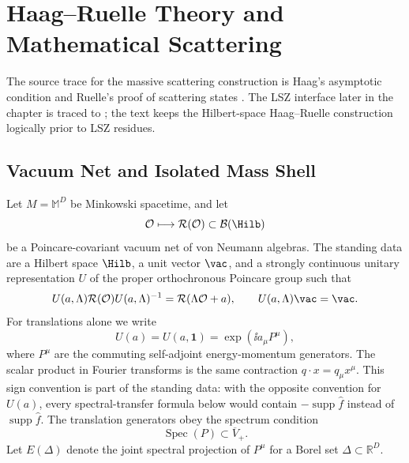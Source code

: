 \chapter{Haag--Ruelle Theory and Mathematical Scattering}
\label{ch:volume-iv-haag-ruelle-mathematical-scattering}
\ConventionsLorentzian

The source trace for the massive scattering construction is Haag's asymptotic
condition and Ruelle's proof of scattering states \cite{Haag1958,Ruelle1962}.
The LSZ interface later in the chapter is traced to \cite{LSZ1955}; the text
keeps the Hilbert-space Haag--Ruelle construction logically prior to LSZ
residues.

\section{Vacuum Net and Isolated Mass Shell}

Let \(M=\mathbb M^D\) be Minkowski spacetime, and let
\[
  \mathcal O\longmapsto \mathcal R(\mathcal O)\subset\mathcal B(\Hilb)
\]
be a Poincare-covariant vacuum net of von Neumann algebras.  The standing
data are a Hilbert space \(\Hilb\), a unit vector \(\vac\), and a strongly
continuous unitary representation \(U\) of the proper orthochronous Poincare
group such that
\[
  U(a,\Lambda)\mathcal R(\mathcal O)U(a,\Lambda)^{-1}
  =
  \mathcal R(\Lambda\mathcal O+a),
  \qquad
  U(a,\Lambda)\vac=\vac .
\]
For translations alone we write
\[
  U(a)=U(a,\mathbf 1)=\exp(\ii a_\mu P^\mu),
\]
where \(P^\mu\) are the commuting self-adjoint energy-momentum generators.
The scalar product in Fourier transforms is the same contraction
\(q\cdot x=q_\mu x^\mu\).  This sign convention is part of the standing data:
with the opposite convention for \(U(a)\), every spectral-transfer formula
below would contain \(-\operatorname{supp}\widehat f\) instead of
\(\operatorname{supp}\widehat f\).
The translation generators obey the spectrum condition
\[
  \operatorname{Spec}(P)\subset \overline V_+ .
\]
Let \(E(\Delta)\) denote the joint spectral projection of \(P^\mu\) for a
Borel set \(\Delta\subset\mathbb R^D\).

